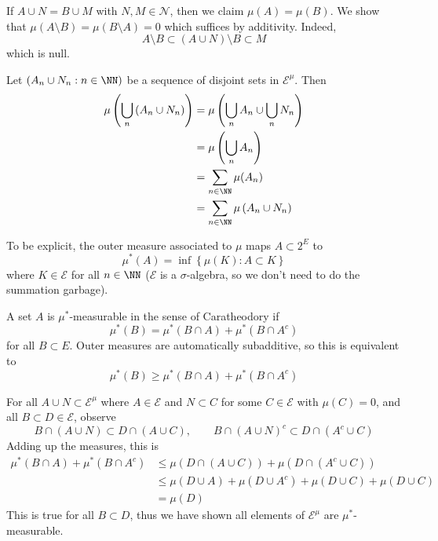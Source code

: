 \documentclass[11pt, headheight=30pt]{scrartcl}
\begin{document}
\begin{psec*}
    If $A \cup N = B \cup M$ with $N,M \in \mathcal{N}$, then
    we claim $\mu(A) = \mu(B)$. We show that
    $\mu(A\setminus B) = \mu(B\setminus A) = 0$ which suffices
    by additivity. Indeed,
    \[
        A\setminus B \subset (A\cup N)\setminus B \subset M    
    \]
    which is null.
\end{psec*}

\begin{psec*}
    Let $(A_n\cup N_n : n\in \NN)$ be a sequence of disjoint sets in $\mathcal{E}^\mu$.
    Then
    \begin{align*}
        \mu\left(\bigcup_n \left(A_n\cup N_n\right)\right) &= \mu\left(\bigcup_n A_n \cup \bigcup_n N_n\right)\\
        &= \mu\left(\bigcup_n A_n\right)\\
        &= \sum_{n\in \NN} \mu(A_n)\\
        &= \sum_{n\in \NN} \mu\left(A_n\cup N_n\right)
    \end{align*}
\end{psec*}

To be explicit, the outer measure associated to $\mu$
maps $A\subset 2^E$ to
\[
    \mu^*(A) = \inf\left\{\mu(K): A\subset K\right\}    
\]
where $K \in \mathcal{E}$ for all $n\in \NN$ ($\mathcal{E}$ is a
$\sigma$-algebra, so we don't need to do the summation garbage).

A set $A$ is $\mu^*$-measurable in the sense of Caratheodory if
\[
    \mu^*(B) = \mu^*(B\cap A) + \mu^*(B\cap A^c)
\]
for all $B\subset E$. Outer measures are automatically subadditive,
so this is equivalent to 
\[
    \mu^*(B) \geq \mu^*(B\cap A) + \mu^*(B\cap A^c)
\]


\begin{psec*}
    For all $A\cup N\subset \mathcal{E}^\mu$ where $A\in \mathcal{E}$
    and $N\subset C$ for some $C\in \mathcal{E}$ with $\mu(C) = 0$,
    and all $B\subset D\in \mathcal{E}$, observe
    \[
        B\cap (A\cup N)\subset D\cap (A\cup C),\qquad B\cap (A\cup N)^c\subset D\cap (A^c\cup C)
    \]
    Adding up the measures, this is
    \begin{align*}
        \mu^*(B\cap A) + \mu^*(B\cap A^c)&\leq \mu(D\cap (A\cup C)) + \mu(D\cap (A^c\cup C))\\
        &\leq \mu(D\cup A) + \mu(D\cup A^c) + \mu(D\cup C) + \mu(D \cup C)\\
        &= \mu(D)
    \end{align*}
    This is true for all $B\subset D$, thus we have shown all elements of $\mathcal{E}^\mu$
    are $\mu^*$-measurable.
\end{psec*}
\end{document}
